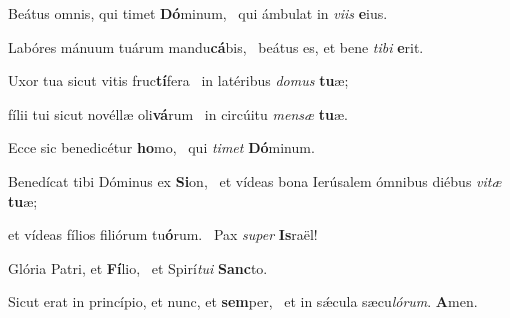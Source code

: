 \item Beátus omnis, qui timet \textbf{Dó}minum,~\psstar{} qui ámbulat in \textit{viis} \textbf{e}ius.

\item Labóres mánuum tuárum mandu\textbf{cá}bis,~\psstar{} beátus es, et bene \textit{tibi} \textbf{e}rit.

\item Uxor tua sicut vitis fruc\textbf{tí}fera~\psstar{} in latéribus \textit{domus} \textbf{tu}æ;

\item fílii tui sicut novéllæ oli\textbf{vá}rum~\psstar{} in circúitu \textit{mensæ} \textbf{tu}æ.

\item Ecce sic benedicétur \textbf{ho}mo,~\psstar{} qui \textit{timet} \textbf{Dó}minum.

\item Benedícat tibi Dóminus ex \textbf{Si}on,~\psstar{} et vídeas bona Ierúsalem ómnibus diébus \textit{vitæ} \textbf{tu}æ;

\item et vídeas fílios filiórum tu\textbf{ó}rum.~\psstar{} Pax \textit{super} \textbf{Is}raël!

\item Glória Patri, et \textbf{Fí}lio,~\psstar{} et Spirí\textit{tui} \textbf{Sanc}to.

\item Sicut erat in princípio, et nunc, et \textbf{sem}per,~\psstar{} et in sǽcula sæcu\textit{lórum}. \textbf{A}men.